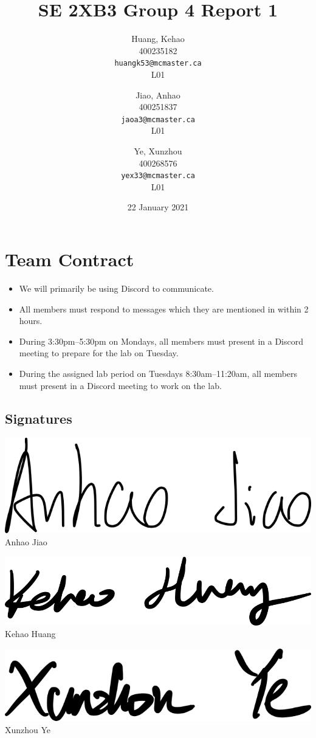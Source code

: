 \documentclass[titlepage, 12pt]{article}
\title{SE 2XB3 Group 4 Report 1}
\author{
  Huang, Kehao \\
  400235182 \\
  \texttt{huangk53@mcmaster.ca} \\
  L01
  \and
  Jiao, Anhao \\
  400251837 \\
  \texttt{jaoa3@mcmaster.ca} \\
  L01
  \and
  Ye, Xunzhou \\
  400268576 \\
  \texttt{yex33@mcmaster.ca} \\
  L01
}
\date{22 January 2021}
\begin{document}
\maketitle{}

\section*{Team Contract}
\label{sec:contract}

\begin{itemize}
\item We will primarily be using Discord to communicate.
\item All members must respond to messages which they are mentioned in within 2
  hours.
\item During 3:30pm--5:30pm on Mondays, all members must present in a Discord
  meeting to prepare for the lab on Tuesday.
\item During the assigned lab period on Tuesdays 8:30am--11:20am, all members
  must present in a Discord meeting to work on the lab.
\end{itemize}

\subsection*{Signatures}

\bigskip{}

\begin{minipage}[t][4em][t]{0.33\linewidth}
  \includegraphics[width=0.8\linewidth]{anhao-signature}
  \centering
  Anhao Jiao
\end{minipage}
\begin{minipage}[t][4em][t]{0.33\linewidth}
  \includegraphics[width=0.8\linewidth]{kehao-signature}
  \centering
  Kehao Huang
\end{minipage}
\begin{minipage}[t][4em][t]{0.33\linewidth}
  \includegraphics[width=0.8\linewidth]{xunzhou-signature}
  \centering
  Xunzhou Ye
\end{minipage}
\end{document}
